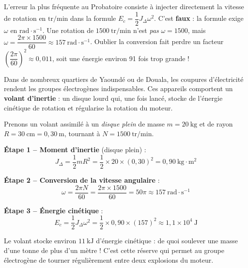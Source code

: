 \documentclass[11pt]{article}
\begin{document}
\begin{attention}
L'erreur la plus fréquente au Probatoire consiste à injecter directement la vitesse de rotation en $\mathrm{tr/min}$ dans la formule $E_c = \dfrac{1}{2}J_\Delta\omega^2$. C'est \textbf{faux} : la formule exige $\omega$ en $\mathrm{rad\cdot s^{-1}}$. Une rotation de $1500~\mathrm{tr/min}$ n'est \emph{pas} $\omega = 1500$, mais $\omega = \dfrac{2\pi \times 1500}{60} \approx 157~\mathrm{rad\cdot s^{-1}}$. Oublier la conversion fait perdre un facteur $\left(\dfrac{2\pi}{60}\right)^2 \approx 0{,}011$, soit une énergie environ 91 fois trop grande !
\end{attention}

\begin{exemplebox}
Dans de nombreux quartiers de Yaoundé ou de Douala, les coupures d'électricité rendent les groupes électrogènes indispensables. Ces appareils comportent un \textbf{volant d'inertie} : un disque lourd qui, une fois lancé, stocke de l'énergie cinétique de rotation et régularise la rotation du moteur.

Prenons un volant assimilé à un \emph{disque plein} de masse $m = 20~\mathrm{kg}$ et de rayon $R = 30~\mathrm{cm} = 0{,}30~\mathrm{m}$, tournant à $N = 1500~\mathrm{tr/min}$.

\textbf{Étape 1 -- Moment d'inertie} (disque plein) :
\[ J_\Delta = \frac{1}{2}mR^2 = \frac{1}{2}\times 20 \times (0{,}30)^2 = 0{,}90~\mathrm{kg\cdot m^2} \]

\textbf{Étape 2 -- Conversion de la vitesse angulaire} :
\[ \omega = \frac{2\pi N}{60} = \frac{2\pi \times 1500}{60} = 50\pi \approx 157~\mathrm{rad\cdot s^{-1}} \]

\textbf{Étape 3 -- Énergie cinétique} :
\[ E_c = \frac{1}{2}J_\Delta\omega^2 = \frac{1}{2}\times 0{,}90\times (157)^2 \approx 1{,}1\times 10^{4}~\mathrm{J} \]

Le volant stocke environ $11~\mathrm{kJ}$ d'énergie cinétique : de quoi soulever une masse d'une tonne de plus d'un mètre ! C'est cette réserve qui permet au groupe électrogène de tourner régulièrement entre deux explosions du moteur.
\end{exemplebox}
\end{document}
